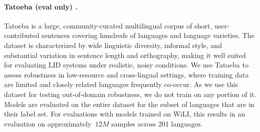 \documentclass{article}
\makeatletter
\DeclareRobustCommand*{\escapeus}[1]{%
  \begingroup
    \edef\x{\endgroup
      \noexpand\@escapeusaux{\unexpanded{#1}}}%
  \x}
\def\@escapeusaux#1{%
  \begingroup
    \@activeus
    \scantokens{#1\endinput}%
  \endgroup}
\def\@activeus{\catcode`\_=\active \let~\_}}
\newcommand{\myemph}[1]{\textsf{{\escapeus{#1}}}}
\newcommand{\fasttext}{\myemph{fastText}\xspace}
\newcommand{\unilid}{\myemph{UniLID}\xspace}
\makeatother
\begin{document}
\paragraph{Tatoeba (eval only) \cite{tiedemann-2020-tatoeba}.} Tatoeba is a large, community-curated multilingual corpus of short, user-contributed sentences covering hundreds of languages and language varieties.
 The dataset is characterized by wide linguistic diversity, informal style, and substantial variation in sentence length and orthography, making it well suited for evaluating LID systems under realistic, noisy conditions. We use Tatoeba to assess robustness in low-resource and cross-lingual settings, where training data are limited and closely related languages frequently co-occur. As we use this dataset for testing out-of-domain robustness, we do not train on any portion of it. Models are evaluated on the entire dataset for the subset of languages that are in their label set. For evaluations with models trained on WiLI, this results in an evaluation on approximately $~12M$ samples across 201 languages.

 
\end{document}
